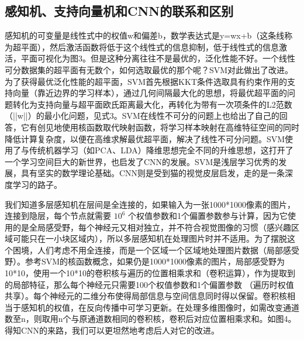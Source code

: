 \documentclass[15pt]{article}
\begin{document}
\subsection{感知机、支持向量机和CNN的联系和区别}
感知机的可变量是线性式中的权值w和偏差b，数学表达式是y=wx+b（这条线称为超平面），然后激活函数将低于这个线性式的信息抑制，低于线性式的信息激活，平面可视化为图3。但是这种分离往往不是最优的，泛化性能不好。一个线性可分数据集的超平面有无数个，如何选取最优的那个呢？SVM对此做出了改进。为了获得最优泛化性能的超平面，SVM首先根据KKT条件选取具有约束作用的支持向量（靠近边界的学习样本），通过几何间隔最大化的思想，将最优超平面的问题转化为支持向量与超平面欧氏距离最大化，再转化为带有一次项条件的L2范数（||w||）的最小化问题，见式3。SVM在线性不可分的问题上也给出了自己的回答，它有创见地使用核函数取代映射函数，将学习样本映射在高维特征空间的同时降低计算复杂度，以便在高维求解最优超平面，解决了线性不可分问题。SVM使用了与传统机器学习（如PCA、LDA）降维思想完全不同的升维思想，这打开了一个学习空间巨大的新世界，也启发了CNN的发展。SVM是浅层学习优秀的发展，具有坚实的数学理论基础。CNN则是受到猫的视觉皮层启发，走的是一条深度学习的路子。

我们知道多层感知机在层间是全连接的，如果输入为一张1000*1000像素的图片，连接到隐层，每个节点就需要 $10^6$ 个权值参数和1个偏置参数参与计算，因为它使用的是全局感受野，每个神经元又相对独立，并不符合视觉图像的习惯（感兴趣区域可能只在一小块区域内），所以多层感知机在处理图片时并不适用。为了摆脱这个困境，人们考虑不用全连接，而是一个区域一个区域地处理图片数据（局部感受野）。参考SVM的核函数概念，如果仍是1000*1000像素的图片，局部感受野为10*10，使用一个10*10的卷积核与遍历的位置相乘求和（卷积运算），作为提取到的局部特征，那么每个神经元只需要100个权值参数和1个偏置参数 （遍历时权值共享）。每个神经元的二维分布使得局部信息与空间信息同时得以保留。卷积核相当于感知机的权值，在反向传播中可学习更新。在处理多维图像时，如需改变通道数至n，则取用n个与原通道数相同的卷积核，卷积后对应位置相乘求和。如图4。得知CNN的来路，我们可以更坦然地考虑后人对它的改进。
\end{document}
